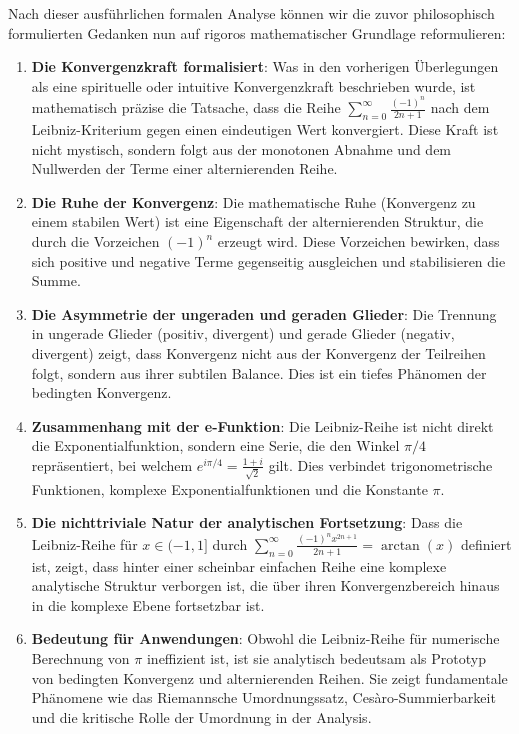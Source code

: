 \documentclass[a4paper,12pt,twoside]{report}
\theoremstyle{definition}
\begin{document}
Nach dieser ausführlichen formalen Analyse können wir die zuvor philosophisch formulierten Gedanken nun auf rigoros mathematischer Grundlage reformulieren:

\begin{enumerate}

\item \textbf{Die Konvergenzkraft formalisiert}: Was in den vorherigen Überlegungen als eine spirituelle oder intuitive Konvergenzkraft beschrieben wurde, ist mathematisch präzise die Tatsache, dass die Reihe $\sum_{n=0}^{\infty} \frac{(-1)^n}{2n+1}$ nach dem Leibniz-Kriterium gegen einen eindeutigen Wert konvergiert. Diese Kraft ist nicht mystisch, sondern folgt aus der monotonen Abnahme und dem Nullwerden der Terme einer alternierenden Reihe.

\item \textbf{Die Ruhe der Konvergenz}: Die mathematische Ruhe (Konvergenz zu einem stabilen Wert) ist eine Eigenschaft der alternierenden Struktur, die durch die Vorzeichen $(-1)^n$ erzeugt wird. Diese Vorzeichen bewirken, dass sich positive und negative Terme gegenseitig ausgleichen und stabilisieren die Summe.

\item \textbf{Die Asymmetrie der ungeraden und geraden Glieder}: Die Trennung in ungerade Glieder (positiv, divergent) und gerade Glieder (negativ, divergent) zeigt, dass Konvergenz nicht aus der Konvergenz der Teilreihen folgt, sondern aus ihrer subtilen Balance. Dies ist ein tiefes Phänomen der bedingten Konvergenz.

\item \textbf{Zusammenhang mit der e-Funktion}: Die Leibniz-Reihe ist nicht direkt die Exponentialfunktion, sondern eine Serie, die den Winkel $\pi/4$ repräsentiert, bei welchem $e^{i\pi/4} = \frac{1+i}{\sqrt{2}}$ gilt. Dies verbindet trigonometrische Funktionen, komplexe Exponentialfunktionen und die Konstante $\pi$.

\item \textbf{Die nichttriviale Natur der analytischen Fortsetzung}: Dass die Leibniz-Reihe für $x \in (-1, 1]$ durch $\sum_{n=0}^{\infty} \frac{(-1)^n x^{2n+1}}{2n+1} = \arctan(x)$ definiert ist, zeigt, dass hinter einer scheinbar einfachen Reihe eine komplexe analytische Struktur verborgen ist, die über ihren Konvergenzbereich hinaus in die komplexe Ebene fortsetzbar ist.

\item \textbf{Bedeutung für Anwendungen}: Obwohl die Leibniz-Reihe für numerische Berechnung von $\pi$ ineffizient ist, ist sie analytisch bedeutsam als Prototyp von bedingten Konvergenz und alternierenden Reihen. Sie zeigt fundamentale Phänomene wie das Riemannsche Umordnungssatz, Cesàro-Summierbarkeit und die kritische Rolle der Umordnung in der Analysis.

\end{enumerate}
\end{document}
